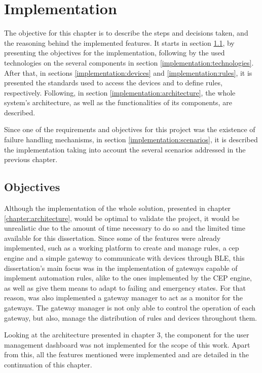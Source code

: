 \chapter{Implementation}
\label{chapter:implementation}

The objective for this chapter is to describe the steps and decisions taken, and the reasoning behind the implemented features. It starts in section \ref{implementation:objectives}, by presenting the objectives for the implementation, following by the used technologies on the several components in section \ref{implementation:technologies}. After that, in sections \ref{implementation:devices} and \ref{implementation:rules}, it is presented the standards used to access the devices and to define rules, respectively. Following, in section \ref{implementation:architecture}, the whole system's architecture, as well as the functionalities of its components, are described. 

Since one of the requirements and objectives for this project was the existence of failure handling mechanisms, in section \ref{implementation:scenarios}, it is described the implementation taking into account the several scenarios addressed in the previous chapter. 

\newpage

\section{Objectives}
\label{implementation:objectives}

Although the implementation of the whole solution, presented in chapter \ref{chapter:architecture}, would be optimal to validate the project, it would be unrealistic due to the amount of time necessary to do so and the limited time available for this dissertation. Since some of the features were already implemented, such as a working platform to create and manage rules, a \ac{cep} engine and a simple gateway to communicate with devices through BLE, this dissertation's main focus was in the implementation of gateways capable of implement automation rules, alike to the ones implemented by the CEP engine, as well as give them means to adapt to failing and emergency states. For that reason, was also implemented a gateway manager to act as a monitor for the gateways. The gateway manager is not only able to control the operation of each gateway, but also, manage the distribution of rules and devices throughout them.

Looking at the architecture presented in chapter 3, the component for the user management dashboard was not implemented for the scope of this work. Apart from this, all the features mentioned were implemented and are detailed in the continuation of this chapter.



